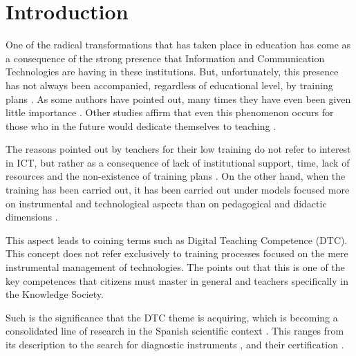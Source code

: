 \documentclass{textolivre}
\begin{document}
\begin{polyabstract}
\begin{portuguese}
\begin{abstract}
\end{abstract}
\end{portuguese}

\end{polyabstract}


\section{Introduction}\label{sec-intro}

One of the radical transformations that has taken place in education has come
as a consequence of the strong presence that Information and Communication
Technologies are having in these institutions. But, unfortunately, this
presence has not always been accompanied, regardless of educational level, by
training plans \cite{casalOtero2018,suarezRodrguez2018,silva2019}.
As some authors have pointed out, many times they have even been given little
importance \cite{bernalBravo2019}. Other studies
affirm that even this phenomenon occurs for those who in the future would
dedicate themselves to teaching \cite{bernalBravo2019}.

The reasons pointed out by teachers for their low training do not refer to
interest in ICT, but rather as a consequence of lack of institutional support,
time, lack of resources and the non-existence of training plans
\cite{fernandezMarquez2018}. On the other hand,
when the training has been carried out, it has been carried out under models
focused more on instrumental and technological aspects than on pedagogical and
didactic dimensions \cite{semerci2018,caberoAlmenara2019}.

This aspect leads to coining terms such as Digital Teaching Competence (DTC).
This concept does not refer exclusively to training processes focused on the
mere instrumental management of technologies. The \textcite{consejoUE2018}
points out that this is one of the key competences that citizens must
master in general and teachers specifically in the Knowledge Society.

Such is the significance that the DTC theme is acquiring, which is becoming a
consolidated line of research in the Spanish scientific context
\cite{rodrguezGarca2019}. This ranges from its description
to the search for diagnostic instruments \cite{esteve2016,duranCuartero2019,intef2017,padillaHernandez2019},
and their certification \cite{duranCuartero2019,amaya2018,gudmundsdottir2017}.
\end{document}
